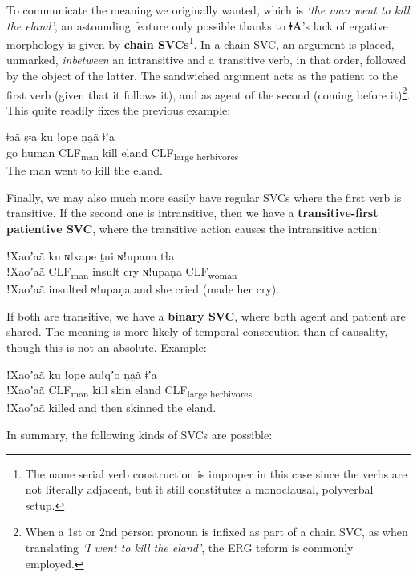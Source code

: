 \documentclass[11pt,a5paper]{book}
\newcommand{\qcn}[1]{\textcolor{AccentText}{\large\textbf{#1}}}
\newcommand{\langname}{\qcn{ǂA}}
\newcommand{\grammsc}[1]{\textsc{#1}}
\newcommand{\CLF}[1]{\grammsc{CLF}\textsubscript{#1}}
\newcommand{\ERG}{\grammsc{ERG}}
\begin{document}
To communicate the meaning we originally wanted, which is \emph{`the man went to kill the eland'}, an astounding feature only possible thanks to \langname{}'s lack of ergative morphology is given by \textbf{chain SVCs}\footnote{The name serial verb construction is improper in this case since the verbs are not literally adjacent, but it still constitutes a monoclausal, polyverbal setup.}. In a chain SVC, an argument is placed, unmarked, \emph{inbetween} an intransitive and a transitive verb, in that order, followed by the object of the latter. The sandwiched argument acts as the patient to the first verb (given that it follows it), and as agent of the second (coming before it)\footnote{When a 1st or 2nd person pronoun is infixed as part of a chain SVC, as when translating \emph{`I went to kill the eland'}, the \ERG{} teform is commonly employed.}. This quite readily fixes the previous example:

\begin{exe}
\ex
\gll ǂaã ṣǂa ku  ǃope ṇa̰ã ǂʼa \\
go human \CLF{man} kill eland \CLF{large herbivores}\\
\glt The man went to kill the eland.
\end{exe}

Finally, we may also much more easily have regular SVCs where the first verb is transitive. If the second one is intransitive, then we have a \textbf{transitive-first patientive SVC}, where the transitive action causes the intransitive action:

\begin{exe}
\ex
\gll ǃXaoʼaã ku ɴǁxape ṯui ɴǃupaṇa  tła\\
ǃXaoʼaã \CLF{man} insult cry ɴǃupaṇa \CLF{woman}\\
\glt ǃXaoʼaã insulted ɴǃupaṇa and she cried (made her cry).
\end{exe}

If both are transitive, we have a \textbf{binary SVC}, where both agent and patient are shared. The meaning is more likely of temporal consecution than of causality, though this is not an absolute. Example:

\begin{exe}
\ex
\gll ǃXaoʼaã ku ǃope auǃqʼo ṇa̰ã ǂʼa\\
ǃXaoʼaã \CLF{man} kill skin eland \CLF{large herbivores}\\
\glt ǃXaoʼaã killed and then skinned the eland.
\end{exe}

In summary, the following kinds of SVCs are possible:
\end{document}
